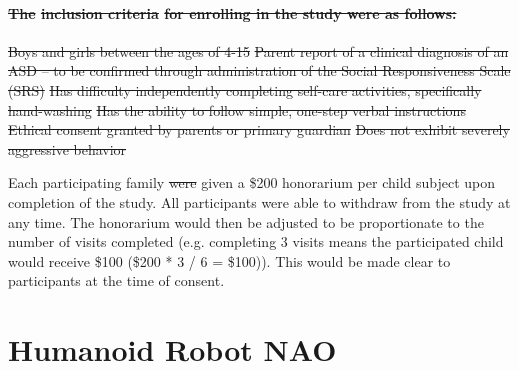 \documentclass{ut-thesis}
\providecommand{\DIFaddtex}[1]{{\protect\color{blue}\uwave{#1}}} %
\providecommand{\DIFdeltex}[1]{{\protect\color{red}\sout{#1}}}                      %
\providecommand{\DIFaddbegin}{} %
\providecommand{\DIFaddend}{} %
\providecommand{\DIFdelbegin}{} %
\providecommand{\DIFdelend}{} %
\providecommand{\DIFadd}[1]{\texorpdfstring{\DIFaddtex{#1}}{#1}} %
\providecommand{\DIFdel}[1]{\texorpdfstring{\DIFdeltex{#1}}{}} %
\begin{document}
\DIFdelbegin \paragraph{\DIFdel{The }\textbf{\DIFdel{inclusion criteria}} %
\DIFdel{for enrolling in the study were as follows:}}
\addtocounter{paragraph}{-1}%
\DIFdel{Boys and girls between the ages of 4-15
	}%
\DIFdel{Parent report of a clinical diagnosis of an ASD – to be confirmed through administration of the Social Responsiveness Scale (SRS)
	}%
\DIFdel{Has difficulty independently completing self-care activities, specifically hand-washing
	}%
\DIFdel{Has the ability to follow simple, one-step verbal instructions
	}%
\DIFdel{Ethical consent  granted by parents or primary guardian
	}%
\DIFdel{Does not exhibit severely aggressive behavior
}%

\DIFdelend Each participating family \DIFdelbegin \DIFdel{were }\DIFdelend \DIFaddbegin \DIFadd{was }\DIFaddend given a \$200 honorarium per child subject upon completion of the study. All participants were able to withdraw from the study at any time. The honorarium would then be adjusted to be proportionate to the number of visits completed (e.g. completing 3 visits means the participated child would receive \$100 (\$200 * 3 / 6 = \$100)). This would be made clear to participants at the time of consent.
\section{Humanoid Robot NAO}
\end{document}
